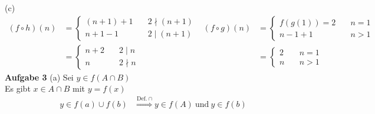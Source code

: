 \documentclass[a4paper, 12pt]{scrartcl}
\theoremstyle{plain}
\begin{document}
(c)
\begin{align*}
(f \circ h)(n) &= \begin{cases}(n+1)+1 &\quad 2  \nmid (n+1) \\ n+1-1 &\quad 2 \mid (n+1) \end{cases} & (f \circ g)(n) &= \begin{cases} f(g(1)) = 2 &\quad n = 1\\ n-1+1 &\quad n > 1\end{cases}\\
&= \begin{cases} n + 2 &\quad 2 \mid n\\n &\quad 2 \nmid n  \end{cases} & &= \begin{cases}2 &\quad n=1\\n &\quad n > 1\end{cases}
\end{align*}
\newpage
\textbf{Aufgabe 3}
(a)
Sei $y \in f(A \cap B)$\\
Es gibt $x \in A \cap B$ mit $y = f(x)$\\
\begin{align*}
	y \in f(a) \cup f(b) &\stackrel{\text{Def.}\ \cap}{\Longrightarrow} y \in f(A)\ \text{und}\ y \in f(b) \\
\end{align*}
\end{document}
